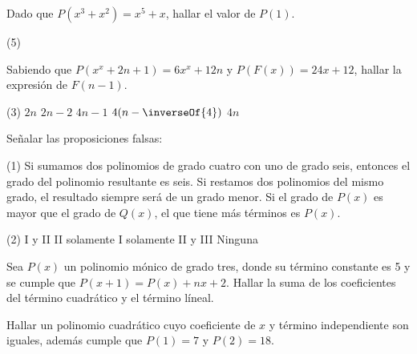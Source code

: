 \begin{multicols}{2}
    \begin{exercise}
        Dado que $P(x^3 + x^2) = x^5 + x$, hallar el valor de $P(1)$.
        \begin{tasks}[label=\Alph*)](5)
        \end{tasks}
    \end{exercise}

    \begin{exercise}
        Sabiendo que $P(x^x + 2n + 1) = 6x^x + 12n$ y $P\left(F(x)\right) = 24x + 12$, hallar la expresión de $F(n - 1)$.
        \begin{tasks}[label=\Alph*)](3)
        \task $2n$
        \task $2n - 2$
        \task $4n - 1$
        \task $4(n - \inverseOf{4})$
        \task $4n$
        \end{tasks}
    \end{exercise}

    \begin{exercise}
        Señalar las proposiciones falsas:
        \begin{tasks}[label=\Roman*.](1)
            \task Si sumamos dos polinomios de grado cuatro con uno de grado seis, entonces el grado del polinomio resultante es seis.
            \task Si restamos dos polinomios del mismo grado, el resultado siempre será de un grado menor.
            \task Si el grado de $P(x)$ es mayor que el grado de $Q(x)$, el que tiene más términos es $P(x)$.
        \end{tasks}
        \begin{tasks}(2)
            \task I y II
            \task II solamente
            \task I solamente
            \task II y III
            \task Ninguna
        \end{tasks}
    \end{exercise}

    \begin{problem}
        Sea $P(x)$ un polinomio mónico de grado tres, donde su término constante es 5 y se cumple que $P(x + 1) = P(x) + nx + 2$.
        Hallar la suma de los coeficientes del término cuadrático y el término líneal.
    \end{problem}

    \begin{problem}
        Hallar un polinomio cuadrático cuyo coeficiente de $x$ y término independiente son iguales, además cumple que $P(1) = 7$ y $P(2) = 18$.
    \end{problem}


\end{multicols}
